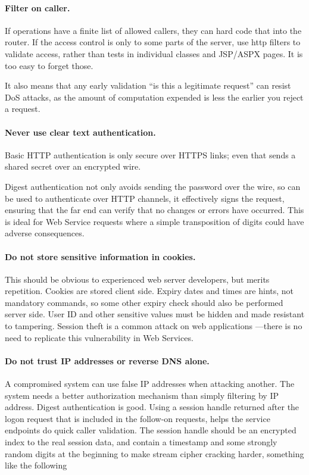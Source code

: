 \documentclass[draft]{report}
\begin{document}
\paragraph{Filter on caller.}

If operations have a finite list of allowed callers, they can hard code
that into the router. If the access control is only to some parts of the
server, use http filters to validate access, rather than tests in
individual classes and JSP/ASPX pages. It is too easy to forget those.

It also means that any early validation ``is this a legitimate request''
can resist DoS attacks, as the amount of computation expended is less
the earlier you reject a request.

\paragraph{Never use clear text authentication.}

Basic HTTP authentication is only secure over HTTPS links; even that
sends a shared secret over an encrypted wire.

Digest authentication not only avoids sending the password over the
wire, so can be used to authenticate over HTTP channels, it effectively
signs the request, ensuring that the far end can verify that no changes
or errors have occurred. This is ideal for Web Service requests where a
simple transposition of digits could have adverse consequences.

\paragraph{Do not store sensitive information in cookies.}

This should be obvious to experienced web server developers, but merits
repetition. Cookies are stored client side. Expiry dates and times are
hints, not mandatory commands, so some other expiry check should also be
performed server side. User ID and other sensitive values must be hidden
and made resistant to tampering. Session theft is a common attack on web
applications \cite{atstake:webapps} ---there is no need to replicate
this vulnerability in Web Services.

\paragraph{Do not trust IP addresses or reverse DNS alone.}

A compromised system can use false IP addresses when attacking another.
The system needs a better authorization mechanism than simply filtering
by IP address. Digest authentication is good. Using a session handle
returned after the logon request that is included in the follow-on
requests, helps the service endpoints do quick caller validation. The
session handle should be an encrypted index to the real session data,
and contain a timestamp and some strongly random digits at the beginning
to make stream cipher cracking harder, something like the following
\end{document}
